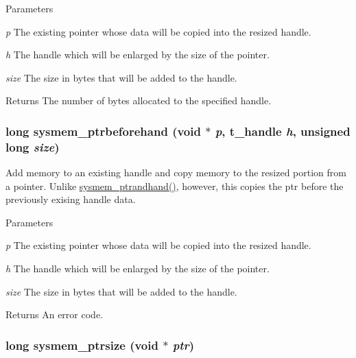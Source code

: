 \begin{DoxyParams}{Parameters}
\item[{\em p}]The existing pointer whose data will be copied into the resized handle. \item[{\em h}]The handle which will be enlarged by the size of the pointer. \item[{\em size}]The size in bytes that will be added to the handle. \end{DoxyParams}
\begin{DoxyReturn}{Returns}
The number of bytes allocated to the specified handle. 
\end{DoxyReturn}
\hypertarget{group__memory_ga52dd152965c42f6b1e14cfdf8b102a30}{
\subsubsection[{sysmem\_\-ptrbeforehand}]{\setlength{\rightskip}{0pt plus 5cm}long sysmem\_\-ptrbeforehand (void $\ast$ {\em p}, \/  {\bf t\_\-handle} {\em h}, \/  unsigned long {\em size})}}
\label{group__memory_ga52dd152965c42f6b1e14cfdf8b102a30}


Add memory to an existing handle and copy memory to the resized portion from a pointer. Unlike \hyperlink{group__memory_gab59295d789b6a720b9ab981a39441cbc}{sysmem\_\-ptrandhand()}, however, this copies the ptr before the previously exising handle data.


\begin{DoxyParams}{Parameters}
\item[{\em p}]The existing pointer whose data will be copied into the resized handle. \item[{\em h}]The handle which will be enlarged by the size of the pointer. \item[{\em size}]The size in bytes that will be added to the handle. \end{DoxyParams}
\begin{DoxyReturn}{Returns}
An error code. 
\end{DoxyReturn}
\hypertarget{group__memory_ga4f847713a1bd083030d60e8752d7c28d}{
\subsubsection[{sysmem\_\-ptrsize}]{\setlength{\rightskip}{0pt plus 5cm}long sysmem\_\-ptrsize (void $\ast$ {\em ptr})}}
\label{group__memory_ga4f847713a1bd083030d60e8752d7c28d}


